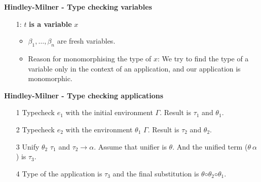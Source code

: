 \documentclass{beamer}
\begin{document}
\begin{frame}[fragile]{\bf Hindley-Milner - Type checking variables}
\begin{enumerate}

\item[1:] $t$ {\bf is a variable} $x$ \\


\begin{itemize}
  \vspace{0.5cm} \item [] 
	\item $\beta_1,\dots,\beta_n$ are fresh variables.
	\item Reason for monomorphising the type of $x$: We try to find the type of a variable only in the context of an application, and our application is monomorphic.
\end{itemize}
\end{enumerate}
\end{frame}

\begin{frame}[fragile]{\bf Hindley-Milner - Type checking applications}
\begin{enumerate}
\item[1] Typecheck $e_1$ with the initial environment $\Gamma$. Result is $\tau_1$ and $\theta_1$.
\item[2] Typecheck $e_2$ with the environment $\theta_1$ $\Gamma$. Result is $\tau_2$ and $\theta_2$.
\item[3] Unify $\theta_2$ $\tau_1$ and $\tau_2 \rightarrow \alpha$. Assume that unifier is $\theta$. And the unified term ($\theta\ \alpha$) is $\tau_3$.
\item[4] Type of the application is $\tau_3$ and the final substitution is $\theta◦\theta_2◦\theta_1$.
\end{enumerate}
\end{frame}
\end{document}
